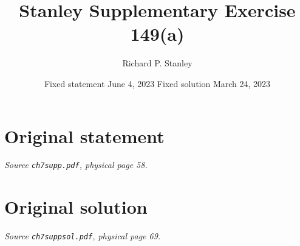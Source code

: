 \documentclass[11pt,a4paper]{article}
\title{Stanley Supplementary Exercise 149(a)}
\author{Richard P. Stanley}
\date{Fixed statement June 4, 2023 \qquad Fixed solution March 24, 2023}
\begin{document}
\maketitle
\section*{Original statement}
\noindent\emph{Source \texttt{ch7supp.pdf}, physical page 58.}\par\medskip

\clearpage
\section*{Original solution}
\noindent\emph{Source \texttt{ch7suppsol.pdf}, physical page 69.}\par\medskip

\end{document}
